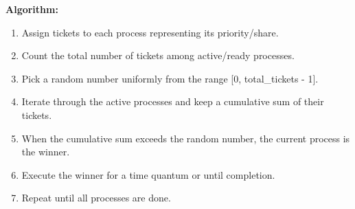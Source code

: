 \documentclass[12pt,a4paper]{article}
\begin{document}
\textbf{Algorithm:}
\begin{enumerate}
    \item Assign tickets to each process representing its priority/share.
    \item Count the total number of tickets among active/ready processes.
    \item Pick a random number uniformly from the range [0, total\_tickets - 1].
    \item Iterate through the active processes and keep a cumulative sum of their tickets.
    \item When the cumulative sum exceeds the random number, the current process is the winner.
    \item Execute the winner for a time quantum or until completion.
    \item Repeat until all processes are done.
\end{enumerate}
\end{document}
